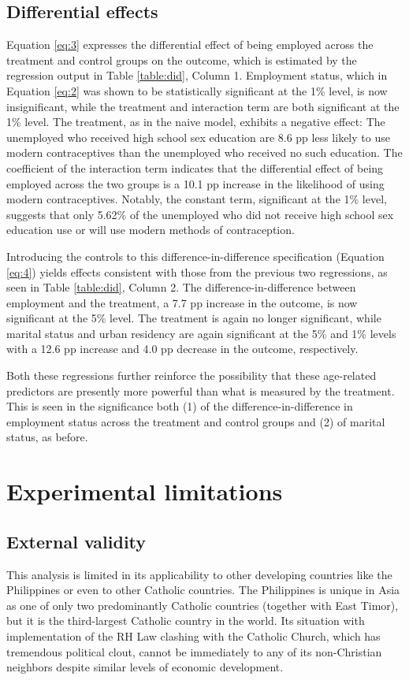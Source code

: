 \documentclass[12pt]{article}
\begin{document}
    \subsection{Differential effects}
    Equation \ref{eq:3} expresses the differential effect of being employed across the treatment and control groups on the outcome, which is estimated by the regression output in Table \ref{table:did}, Column 1.
    Employment status, which in Equation \ref{eq:2} was shown to be statistically significant at the 1\% level, is now insignificant, while the treatment and interaction term are both significant at the 1\% level.
    The treatment, as in the naive model, exhibits a negative effect: The unemployed who received high school sex education are 8.6 pp less likely to use modern contraceptives than the unemployed who received no such education.
    The coefficient of the interaction term indicates that the differential effect of being employed across the two groups is a 10.1 pp increase in the likelihood of using modern contraceptives.
    Notably, the constant term, significant at the 1\% level, suggests that only 5.62\% of the unemployed who did not receive high school sex education use or will use modern methods of contraception.

    Introducing the controls to this difference-in-difference specification (Equation \ref{eq:4}) yields effects consistent with those from the previous two regressions, as seen in Table \ref{table:did}, Column 2.
    The difference-in-difference between employment and the treatment, a 7.7 pp increase in the outcome, is now significant at the 5\% level.
    The treatment is again no longer significant, while marital status and urban residency are again significant at the 5\% and 1\% levels with a 12.6 pp increase and 4.0 pp decrease in the outcome, respectively.

    Both these regressions further reinforce the possibility that these age-related predictors are presently more powerful than what is measured by the treatment.
    This is seen in the significance both (1) of the difference-in-difference in employment status across the treatment and control groups and (2) of marital status, as before.


\section{Experimental limitations}
    \subsection{External validity}
    This analysis is limited in its applicability to other developing countries like the Philippines or even to other Catholic countries.
    The Philippines is unique in Asia as one of only two predominantly Catholic countries (together with East Timor), but it is the third-largest Catholic country in the world.
    Its situation with implementation of the RH Law clashing with the Catholic Church, which has tremendous political clout, cannot be immediately to any of its non-Christian neighbors despite similar levels of economic development.
\end{document}
